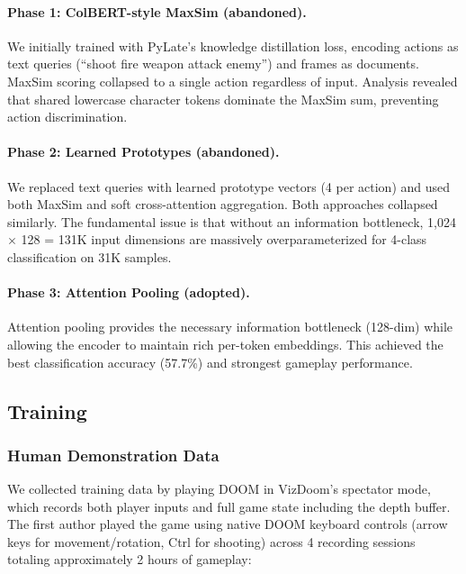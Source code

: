\documentclass[11pt,a4paper]{article}
\begin{document}
\paragraph{Phase 1: ColBERT-style MaxSim (abandoned).} We initially trained with PyLate's knowledge distillation loss, encoding actions as text queries (``shoot fire weapon attack enemy'') and frames as documents. MaxSim scoring collapsed to a single action regardless of input. Analysis revealed that shared lowercase character tokens dominate the MaxSim sum, preventing action discrimination.

\paragraph{Phase 2: Learned Prototypes (abandoned).} We replaced text queries with learned prototype vectors (4 per action) and used both MaxSim and soft cross-attention aggregation. Both approaches collapsed similarly. The fundamental issue is that without an information bottleneck, 1,024 $\times$ 128 = 131K input dimensions are massively overparameterized for 4-class classification on 31K samples.

\paragraph{Phase 3: Attention Pooling (adopted).} Attention pooling provides the necessary information bottleneck (128-dim) while allowing the encoder to maintain rich per-token embeddings. This achieved the best classification accuracy (57.7\%) and strongest gameplay performance.

\subsection{Training}

\subsubsection{Human Demonstration Data}

We collected training data by playing DOOM in VizDoom's spectator mode, which records both player inputs and full game state including the depth buffer. The first author played the game using native DOOM keyboard controls (arrow keys for movement/rotation, Ctrl for shooting) across 4 recording sessions totaling approximately 2 hours of gameplay:
\end{document}
